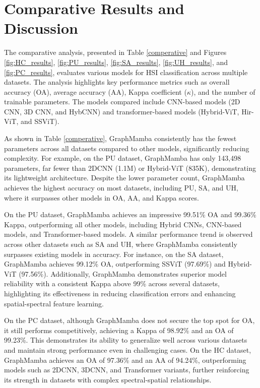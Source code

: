 \documentclass[journal]{IEEEtran}
\begin{document}
\section{Comparative Results and Discussion}
\label{Results}

The comparative analysis, presented in Table \ref{comperative} and Figures \ref{fig:HC_results}, \ref{fig:PU_results}, \ref{fig:SA_results}, \ref{fig:UH_results}, and \ref{fig:PC_results}, evaluates various models for HSI classification across multiple datasets. The analysis highlights key performance metrics such as overall accuracy (OA), average accuracy (AA), Kappa coefficient ($\kappa$), and the number of trainable parameters. The models compared include CNN-based models (2D CNN, 3D CNN, and HybCNN) and transformer-based models (Hybrid-ViT, Hir-ViT, and SSViT).

As shown in Table \ref{comperative}, GraphMamba consistently has the fewest parameters across all datasets compared to other models, significantly reducing complexity. For example, on the PU dataset, GraphMamba has only 143,498 parameters, far fewer than 2DCNN (1.1M) or Hybrid-ViT (835K), demonstrating its lightweight architecture. Despite the lower parameter count, GraphMamba achieves the highest accuracy on most datasets, including PU, SA, and UH, where it surpasses other models in OA, AA, and Kappa scores.

On the PU dataset, GraphMamba achieves an impressive 99.51\% OA and 99.36\% Kappa, outperforming all other models, including Hybrid CNNs, CNN-based models, and Transformer-based models. A similar performance trend is observed across other datasets such as SA and UH, where GraphMamba consistently surpasses existing models in accuracy. For instance, on the SA dataset, GraphMamba achieves 99.12\% OA, outperforming SSViT (97.69\%) and Hybrid-ViT (97.56\%). Additionally, GraphMamba demonstrates superior model reliability with a consistent Kappa above 99\% across several datasets, highlighting its effectiveness in reducing classification errors and enhancing spatial-spectral feature learning.

On the PC dataset, although GraphMamba does not secure the top spot for OA, it still performs competitively, achieving a Kappa of 98.92\% and an OA of 99.23\%. This demonstrates its ability to generalize well across various datasets and maintain strong performance even in challenging cases. On the HC dataset, GraphMamba achieves an OA of 97.36\% and an AA of 94.24\%, outperforming models such as 2DCNN, 3DCNN, and Transformer variants, further reinforcing its strength in datasets with complex spectral-spatial relationships.
\end{document}

